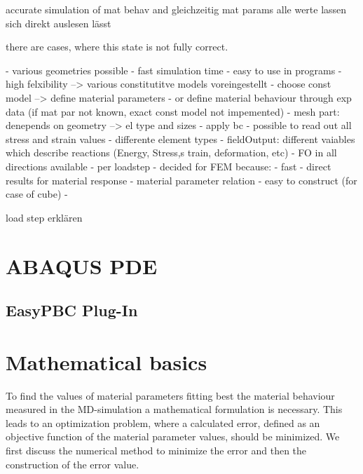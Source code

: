 accurate simulation of mat behav and gleichzeitig mat params 
alle werte lassen sich direkt auslesen 
lässt 



there are cases, where this state is not fully correct. 



- various geometries possible
- fast simulation time
- easy to use in programs
- high felxibility --> various constitutitve models voreingestellt
- choose const model --> define material parameters 
- or define material behaviour through exp data (if mat par not known, exact const model not impemented)
- mesh part: denepends on geometry --> el type and sizes
- apply bc 
- possible to read out all stress and strain values
- differente element types
- fieldOutput: different vaiables which describe reactions (Energy, Stress,s train, deformation, etc)
- FO in all directions available
- per loadstep
- decided for FEM because:
- fast
- direct results for material response - material parameter relation
- easy to construct (for case of cube)
- 




load step erklären
\section{ABAQUS PDE} \label{sec: AbaqusBasics}
\subsection{EasyPBC Plug-In} \label{subsec: EasPBC}



\section{Mathematical basics} \label{sec: mathematics}

To find the values of material parameters fitting best the material behaviour measured in the MD-simulation a mathematical formulation is necessary. This leads to an optimization problem, where a calculated error, defined as an objective function of the material parameter values, should be minimized. We first discuss the numerical method to minimize the error and then the construction of the error value.

